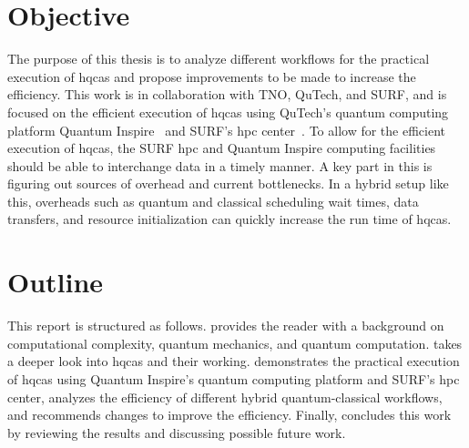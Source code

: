 \section{Objective}
The purpose of this thesis is to analyze different workflows for the practical execution of \glspl{hqca} and propose improvements to be made to increase the efficiency.
This work is in collaboration with TNO, QuTech, and SURF, and is focused on the efficient execution of \glspl{hqca} using QuTech's quantum computing platform Quantum Inspire~\cite{quantuminspire} and SURF's \gls{hpc} center~\cite{surf}.
To allow for the efficient execution of \glspl{hqca}, the SURF \gls{hpc} and Quantum Inspire computing facilities should be able to interchange data in a timely manner.
A key part in this is figuring out sources of overhead and current bottlenecks.
In a hybrid setup like this, overheads such as quantum and classical scheduling wait times, data transfers, and resource initialization can quickly increase the run time of \glspl{hqca}.

\section{Outline}
This report is structured as follows.
 provides the reader with a background on computational complexity, quantum mechanics, and quantum computation.
 takes a deeper look into \glspl{hqca} and their working.
 demonstrates the practical execution of \glspl{hqca} using Quantum Inspire's quantum computing platform and SURF's \gls{hpc} center, analyzes the efficiency of different hybrid quantum-classical workflows, and recommends changes to improve the efficiency.
Finally,  concludes this work by reviewing the results and discussing possible future work.
